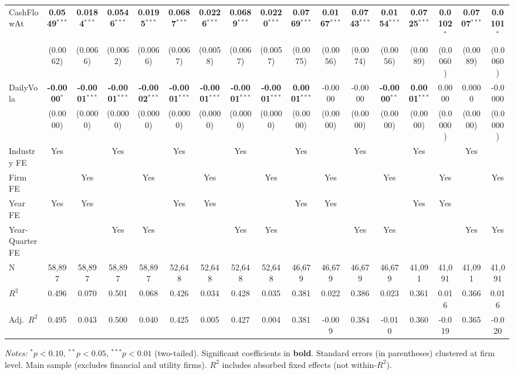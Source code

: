 \documentclass[11pt,a4paper]{article}
\begin{document}
\begin{table}[htbp]
\begin{tabular}{lcccccccccccccccc}
CashFlowAt & \textbf{0.0549}$^{***}$ & \textbf{0.0184}$^{***}$ & \textbf{0.0546}$^{***}$ & \textbf{0.0195}$^{***}$ & \textbf{0.0687}$^{***}$ & \textbf{0.0226}$^{***}$ & \textbf{0.0689}$^{***}$ & \textbf{0.0220}$^{***}$ & \textbf{0.0769}$^{***}$ & \textbf{0.0167}$^{***}$ & \textbf{0.0743}$^{***}$ & \textbf{0.0154}$^{***}$ & \textbf{0.0725}$^{***}$ & \textbf{0.0102}$^{*}$ & \textbf{0.0707}$^{***}$ & \textbf{0.0101}$^{*}$ \\
 & (0.0062) & (0.0066) & (0.0062) & (0.0066) & (0.0067) & (0.0058) & (0.0067) & (0.0057) & (0.0075) & (0.0056) & (0.0074) & (0.0056) & (0.0089) & (0.0060) & (0.0089) & (0.0060) \\
DailyVola & \textbf{-0.0000}$^{*}$ & \textbf{-0.0001}$^{***}$ & \textbf{-0.0001}$^{***}$ & \textbf{-0.0002}$^{***}$ & \textbf{-0.0001}$^{***}$ & \textbf{-0.0001}$^{***}$ & \textbf{-0.0001}$^{***}$ & \textbf{-0.0001}$^{***}$ & \textbf{0.0001}$^{***}$ & -0.0000 & -0.0000 & \textbf{-0.0000}$^{**}$ & \textbf{0.0001}$^{***}$ & 0.0000 & 0.0000 & -0.0000 \\
 & (0.0000) & (0.0000) & (0.0000) & (0.0000) & (0.0000) & (0.0000) & (0.0000) & (0.0000) & (0.0000) & (0.0000) & (0.0000) & (0.0000) & (0.0000) & (0.0000) & (0.0000) & (0.0000) \\
\midrule
Industry FE & Yes &  & Yes &  & Yes &  & Yes &  & Yes &  & Yes &  & Yes &  & Yes &  \\
Firm FE &  & Yes &  & Yes &  & Yes &  & Yes &  & Yes &  & Yes &  & Yes &  & Yes \\
Year FE & Yes & Yes &  &  & Yes & Yes &  &  & Yes & Yes &  &  & Yes & Yes &  &  \\
Year-Quarter FE &  &  & Yes & Yes &  &  & Yes & Yes &  &  & Yes & Yes &  &  & Yes & Yes \\
\midrule
N & 58,897 & 58,897 & 58,897 & 58,897 & 52,648 & 52,648 & 52,648 & 52,648 & 46,679 & 46,679 & 46,679 & 46,679 & 41,091 & 41,091 & 41,091 & 41,091 \\
$R^2$ & 0.496 & 0.070 & 0.501 & 0.068 & 0.426 & 0.034 & 0.428 & 0.035 & 0.381 & 0.022 & 0.386 & 0.023 & 0.361 & 0.016 & 0.366 & 0.016 \\
Adj.~$R^2$ & 0.495 & 0.043 & 0.500 & 0.040 & 0.425 & 0.005 & 0.427 & 0.004 & 0.381 & -0.009 & 0.384 & -0.010 & 0.360 & -0.019 & 0.365 & -0.020 \\
\bottomrule
\end{tabular}
\begin{minipage}{\linewidth}
\vspace{2pt}\scriptsize
\textit{Notes:} $^{*}p<0.10$, $^{**}p<0.05$, $^{***}p<0.01$ (two-tailed).
 Significant coefficients in \textbf{bold}.
 Standard errors (in parentheses) clustered at firm level.
 Main sample (excludes financial and utility firms).
 $R^2$ includes absorbed fixed effects (not within-$R^2$).
\end{minipage}
\end{table}
\end{document}
